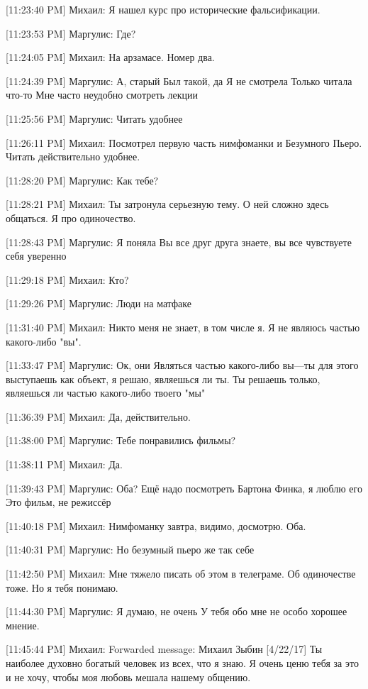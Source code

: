 \documentclass{article}
\begin{document}
[11:23:40 PM] Михаил:
Я нашел курс про исторические фальсификации.

[11:23:53 PM] Маргулис:
Где?

[11:24:05 PM] Михаил:
На арзамасе.
 Номер два.

[11:24:39 PM] Маргулис:
А, старый
 Был такой, да
 Я не смотрела
 Только читала что-то
 Мне часто неудобно смотреть лекции

[11:25:56 PM] Маргулис:
Читать удобнее

[11:26:11 PM] Михаил:
Посмотрел первую часть нимфоманки и Безумного Пьеро.
 Читать действительно удобнее.

[11:28:20 PM] Маргулис:
Как тебе?

[11:28:21 PM] Михаил:
Ты затронула серьезную тему. О ней сложно здесь общаться.
 Я про одиночество.

[11:28:43 PM] Маргулис:
Я поняла
 Вы все друг друга знаете, вы все чувствуете себя уверенно

[11:29:18 PM] Михаил:
Кто?

[11:29:26 PM] Маргулис:
Люди на матфаке

[11:31:40 PM] Михаил:
Никто меня не знает, в том числе я.
 Я не являюсь частью какого-либо "вы".

[11:33:47 PM] Маргулис:
Ок, они
 Являться частью какого-либо вы—ты для этого выступаешь как объект, я решаю, являешься ли ты. Ты решаешь только, являешься ли частью какого-либо твоего "мы"

[11:36:39 PM] Михаил:
Да, действительно.

[11:38:00 PM] Маргулис:
Тебе понравились фильмы?

[11:38:11 PM] Михаил:
Да.

[11:39:43 PM] Маргулис:
Оба?
 Ещё надо посмотреть Бартона Финка, я люблю его
 Это фильм, не режиссёр

[11:40:18 PM] Михаил:
Нимфоманку завтра, видимо, досмотрю. Оба.

[11:40:31 PM] Маргулис:
Но безумный пьеро же так себе

[11:42:50 PM] Михаил:
Мне тяжело писать об этом в телеграме.
 Об одиночестве тоже. Но я тебя понимаю.

[11:44:30 PM] Маргулис:
Я думаю, не очень
 У тебя обо мне не особо хорошее мнение.

[11:45:44 PM] Михаил:
Forwarded message: Михаил Зыбин [4/22/17] 
Ты наиболее духовно богатый человек из всех, что я знаю. Я очень ценю тебя за это и не хочу, чтобы моя любовь мешала нашему общению.
\end{document}
